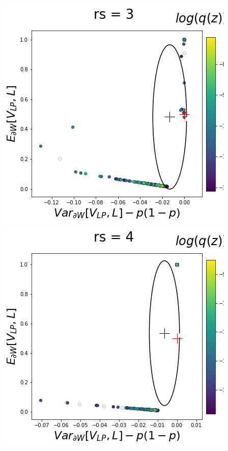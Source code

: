 \documentclass[11pt]{article}
\begin{document}
\begin{center}
\includegraphics[scale=0.33]{figs/T_x_SC_reduced_c=0_p=50_rs=3.png} \\
\includegraphics[scale=0.33]{figs/T_x_SC_reduced_c=0_p=50_rs=4.png}

\end{center}
\end{document}
